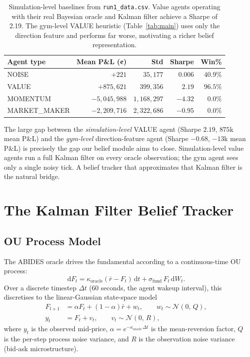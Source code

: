 \documentclass[11pt]{article}
\begin{document}
\begin{table}[H]
\centering
\begin{tabular}{lrrrr}
\toprule
\textbf{Agent type} & \textbf{Mean P\&L (¢)} & \textbf{Std} & \textbf{Sharpe} & \textbf{Win\%} \\
\midrule
NOISE        & $+221$         & $35{,}177$    & $0.006$  & $40.9\%$ \\
VALUE        & $+875{,}621$   & $399{,}356$   & $2.19$   & $96.5\%$ \\
MOMENTUM     & $-5{,}045{,}988$ & $1{,}168{,}297$ & $-4.32$ & $0.0\%$ \\
MARKET\_MAKER & $-2{,}209{,}716$ & $2{,}322{,}686$ & $-0.95$ & $0.0\%$ \\
\bottomrule
\end{tabular}
\caption{Simulation-level baselines from \texttt{run1\_data.csv}.
Value agents operating with their real Bayesian oracle and Kalman filter
achieve a Sharpe of 2.19. The gym-level VALUE heuristic (Table~\ref{tab:main})
uses only the direction feature and performs far worse,
motivating a richer belief representation.}
\label{tab:sim_baselines}
\end{table}

The large gap between the \emph{simulation-level} VALUE agent (Sharpe $2.19$,
$875$k\textcent{} mean P\&L) and the \emph{gym-level} direction-feature agent
(Sharpe $-0.68$, $-13$k\textcent{} mean P\&L) is precisely the gap our belief
module aims to close. Simulation-level value agents run a full Kalman filter
on every oracle observation; the gym agent sees only a single noisy tick.
A belief tracker that approximates that Kalman filter is the natural bridge.

\section{The Kalman Filter Belief Tracker}

\subsection{OU Process Model}

The ABIDES oracle drives the fundamental according to a continuous-time OU
process:
\[
\mathrm{d}F_t = \kappa_{\text{oracle}}(\bar{r} - F_t)\,\mathrm{d}t
              + \sigma_{\text{fund}}\,F_t\,\mathrm{d}W_t.
\]
Over a discrete timestep $\Delta t$ (60 seconds, the agent wakeup interval),
this discretises to the linear-Gaussian state-space model
\begin{align}
F_{t+1} &= \alpha F_t + (1 - \alpha)\bar{r} + w_t, \qquad w_t \sim \mathcal{N}(0,\,Q),
\label{eq:state}\\
y_t     &= F_t + v_t,                             \qquad v_t \sim \mathcal{N}(0,\,R),
\label{eq:obs}
\end{align}
where $y_t$ is the observed mid-price, $\alpha = e^{-\kappa_{\text{oracle}}\,\Delta t}$
is the mean-reversion factor, $Q$ is the per-step process noise variance, and
$R$ is the observation noise variance (bid-ask microstructure).
\end{document}
